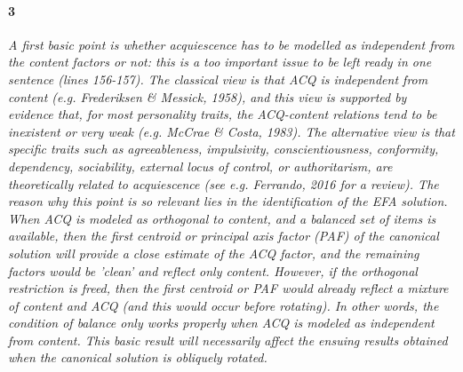 \documentclass[a4paper]{article}
\begin{document}
\paragraph{3} \textit{A first basic point is whether acquiescence has to be modelled as independent from the content factors or not: this is a too important issue to be left ready in one sentence (lines 156-157). The classical view is that ACQ is independent from content (e.g. Frederiksen \& Messick, 1958), and this view is supported by evidence that, for most personality traits, the ACQ-content relations tend to be inexistent or very weak (e.g. McCrae \& Costa, 1983). The alternative view is that specific traits such as agreeableness, impulsivity, conscientiousness, conformity, dependency, sociability, external locus of control, or authoritarism, are theoretically related to acquiescence (see e.g. Ferrando, 2016 for a review). The reason why this point is so relevant lies in the identification of the EFA solution. When ACQ is modeled as orthogonal to content, and a balanced set of items is available, then the first centroid or principal axis factor (PAF) of the canonical solution will provide a close estimate of the ACQ factor, and the remaining factors would be 'clean' and reflect only content. However, if the orthogonal restriction is freed, then the first centroid or PAF would already reflect a mixture of content and ACQ (and this would occur before rotating). In other words, the condition of balance only works properly when ACQ is modeled as independent from content. This basic result will necessarily affect the ensuing results obtained when the canonical solution is obliquely rotated.}
\end{document}
